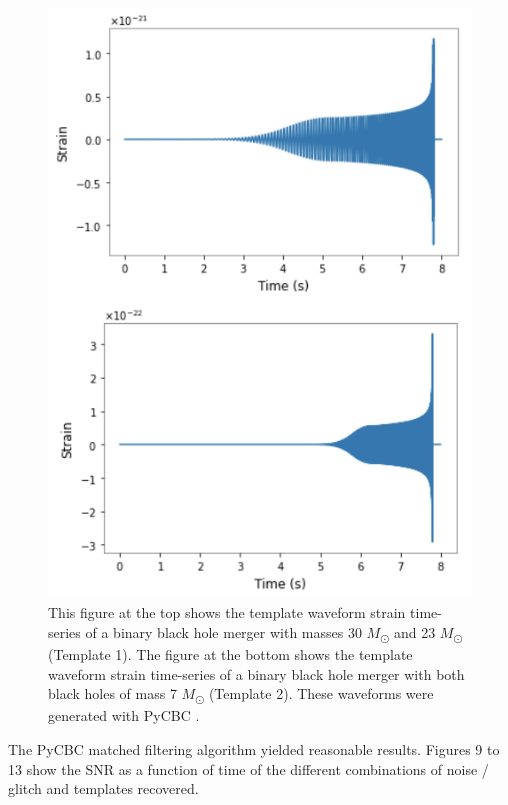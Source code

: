 \documentclass[preprint,
letterpaper,
 amsmath,amssymb,
 aps,
]{revtex4-2}
\begin{document}
\begin{figure}[t]
\caption{This figure at the top shows the template waveform strain time-series of a binary black hole merger with masses 30 $M$\textsubscript{\(\odot\)} and 23 $M$\textsubscript{\(\odot\)} (Template 1). The figure at the bottom shows the template waveform strain time-series of a binary black hole merger with both black holes of mass 7 $M$\textsubscript{\(\odot\)} (Template 2). These waveforms were generated with PyCBC \cite{pycbc}.}
\includegraphics[scale = 1]{templates.png}
\centering
\end{figure} 

The PyCBC matched filtering algorithm yielded reasonable results. Figures 9 to 13 show the SNR as a function of time of the different combinations of noise / glitch and templates recovered.
\end{document}
